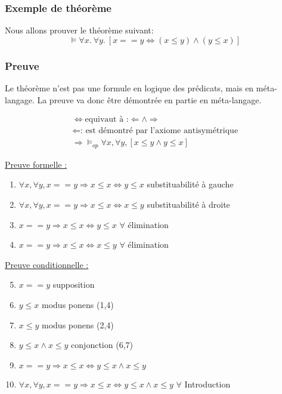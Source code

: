 \subsubsection{Exemple de théorème}

Nous allons prouver le théorème suivant:
$$\models \forall x.\ \forall y.\  [x==y \Leftrightarrow (x\leq y)\land (y \leq x)] $$

\subsubsection{Preuve}

Le théorème n'est pas une formule en logique des prédicats, mais en méta-langage.
La preuve va donc être démontrée en partie en méta-langage.

\begin{align*}
\Leftrightarrow \text{equivaut à :} \Leftarrow \land \Rightarrow \\
\Leftarrow \text{: est démontré par l'axiome antisymétrique} \\	
\Rightarrow \models_{op} \forall x, \forall y, [x\leq y \land y \leq x] 
\end{align*}

\underline{Preuve formelle :}
\begin{enumerate}
\item $ \forall x, \forall y, x==y \Rightarrow x \leq x \Leftrightarrow y \leq x$ \hfill substituabilité à gauche
\item $ \forall x, \forall y, x==y \Rightarrow x \leq x \Leftrightarrow x \leq y$ \hfill substituabilité à droite
\item $ x==y \Rightarrow x \leq x \Leftrightarrow y \leq x $ \hfill $\forall$ élimination
\item $ x==y \Rightarrow x \leq x \Leftrightarrow x \leq y $ \hfill $\forall$ élimination
\end{enumerate}

\underline{Preuve conditionnelle :}
\begin{enumerate}
\setcounter{enumi}{4}
\item $ x==y$ \hfill supposition
\item $ y\leq x$ \hfill modus ponens (1,4)
\item $ x\leq y$ \hfill modus ponens (2,4)
\item $ y\leq x \land  x\leq y$ \hfill conjonction (6,7)
\item $ x==y \Rightarrow x \leq x \Leftrightarrow y\leq x \land  x\leq y$
\item $ \forall x, \forall y, x==y \Rightarrow x \leq x \Leftrightarrow y\leq x \land  x\leq y$ \hfill $\forall$ Introduction
\end{enumerate}
